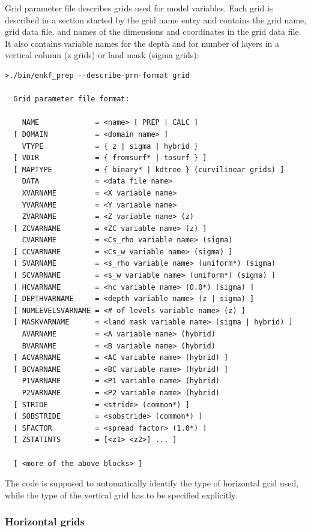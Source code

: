 \documentclass[11pt]{report}
\begin{document}
Grid parameter file describes grids used for model variables.
Each grid is described in a section started by the grid name entry and contains the grid name, grid data file, and names of the dimensions and coordinates in the grid data file.
It also contains variable names for the depth and for number of layers in a vertical column (z grids) or land mask (sigma grids):
\begin{Verbatim}[frame=single,fontsize=\footnotesize]
>./bin/enkf_prep --describe-prm-format grid

  Grid parameter file format:

    NAME             = <name> [ PREP | CALC ]
  [ DOMAIN           = <domain name> ]
    VTYPE            = { z | sigma | hybrid }
  [ VDIR             = { fromsurf* | tosurf } ]
  [ MAPTYPE          = { binary* | kdtree } (curvilinear grids) ]
    DATA             = <data file name>
    XVARNAME         = <X variable name>
    YVARNAME         = <Y variable name>
    ZVARNAME         = <Z variable name> (z)
  [ ZCVARNAME        = <ZC variable name> (z) ]
    CVARNAME         = <Cs_rho variable name> (sigma)
  [ CCVARNAME        = <Cs_w variable name> (sigma) ]
  [ SVARNAME         = <s_rho variable name> (uniform*) (sigma)
  [ SCVARNAME        = <s_w variable name> (uniform*) (sigma) ]
  [ HCVARNAME        = <hc variable name> (0.0*) (sigma) ]
  [ DEPTHVARNAME     = <depth variable name> (z | sigma) ]
  [ NUMLEVELSVARNAME = <# of levels variable name> (z) ]
  [ MASKVARNAME      = <land mask variable name> (sigma | hybrid) ]
    AVARNAME         = <A variable name> (hybrid)
    BVARNAME         = <B variable name> (hybrid)
  [ ACVARNAME        = <AC variable name> (hybrid) ]
  [ BCVARNAME        = <BC variable name> (hybrid) ]
    P1VARNAME        = <P1 variable name> (hybrid)
    P2VARNAME        = <P2 variable name> (hybrid)
  [ STRIDE           = <stride> (common*) ]
  [ SOBSTRIDE        = <sobstride> (common*) ]
  [ SFACTOR          = <spread factor> (1.0*) ]
  [ ZSTATINTS        = [<z1> <z2>] ... ]

  [ <more of the above blocks> ]
\end{Verbatim}

The code is supposed to automatically identify the type of horizontal grid used, while the type of the vertical grid has to be specified explicitly.

\subsubsection{Horizontal grids}
\label{sec:hgrid}
\end{document}
